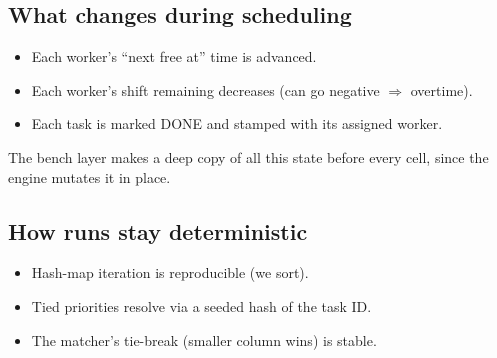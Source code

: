 \subsection{What changes during scheduling}

\begin{itemize}
  \item Each worker's ``next free at'' time is advanced.
  \item Each worker's shift remaining decreases (can go negative
        $\Rightarrow$ overtime).
  \item Each task is marked DONE and stamped with its assigned
        worker.
\end{itemize}

\noindent
The bench layer makes a deep copy of all this state before every
cell, since the engine mutates it in place.

\subsection{How runs stay deterministic}

\begin{itemize}
  \item Hash-map iteration is reproducible (we sort).
  \item Tied priorities resolve via a seeded hash of the task ID.
  \item The matcher's tie-break (smaller column wins) is stable.
\end{itemize}
